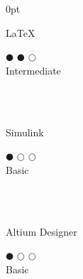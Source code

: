 \documentclass[a4paper]{article}
\begin{document}
\begin{adjustwidth}{\parindent}{0pt}
\begin{minipage}[t]{0.25\textwidth}
 \begin{minipage}{0.65\textwidth}
   \small{\LaTeX}
 \end{minipage}
 \begin{minipage}{0.3\textwidth}
   \centering $\mdlgblkcircle$ $\mdlgblkcircle$ $\mdlgwhtcircle$ \\  \footnotesize{Intermediate}
 \end{minipage} \\ \hspace{0pt} \\
 
 \begin{minipage}{0.65\textwidth}
   \small{Simulink}
 \end{minipage}
 \begin{minipage}{0.3\textwidth}
   \centering $\mdlgblkcircle$ $\mdlgwhtcircle$ $\mdlgwhtcircle$ \\  \footnotesize{Basic}
 \end{minipage} \\ \hspace{0pt} \\
 
  \begin{minipage}{0.65\textwidth}
   \small{Altium Designer}
 \end{minipage}
 \begin{minipage}{0.3\textwidth}
   \centering $\mdlgblkcircle$ $\mdlgwhtcircle$ $\mdlgwhtcircle$ \\  \footnotesize{Basic}
 \end{minipage} \\ \hspace{0pt} \\

\end{minipage}
\end{adjustwidth}
\end{document}
